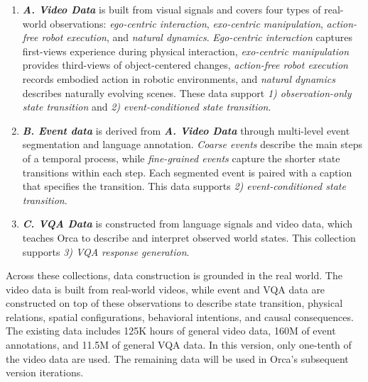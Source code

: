 \documentclass{llmxive}
\begin{document}
\vspace{-1ex}
\begin{enumerate}[
    leftmargin=1.35em,
    itemsep=0.35em,
    topsep=0.35em,
    parsep=0em
]
    \item[] 
    \textit{\textbf{A. Video Data}} is built from visual signals and covers four types of real-world observations: \textit{{ego-centric interaction}}, \textit{{exo-centric manipulation}}, {\textit{action-free robot execution}}, and {\textit{natural dynamics}}. {\textit{Ego-centric interaction}} captures first-views experience during physical interaction, {\textit{exo-centric manipulation}} provides third-views of object-centered changes, {\textit{action-free robot execution}} records embodied action in robotic environments, and {\textit{natural dynamics}} describes naturally evolving scenes. These data support \textit{1) observation-only state transition} and \textit{2) event-conditioned state transition}.

    \item[] 
    \textit{\textbf{B. Event data}} is derived from \textit{\textbf{A. Video Data}} through multi-level event segmentation and language annotation. {\textit{Coarse events}} describe the main steps of a temporal process, while {\textit{fine-grained events}} capture the shorter state transitions within each step. Each segmented event is paired with a caption that specifies the transition. This data supports \textit{2) event-conditioned state transition}.

    \item[]
    \textit{\textbf{C. VQA Data}} is constructed from language signals and video data, which teaches Orca to describe and interpret observed world states. This collection supports \textit{3) VQA response generation}.
\end{enumerate}
\vspace{-1ex}

Across these collections, data construction is grounded in the real world. The video data is built from real-world videos, while event and VQA data are constructed on top of these observations to describe state transition, physical relations, spatial configurations, behavioral intentions, and causal consequences. The existing data includes 125K hours of general video data, 160M of event annotations, and 11.5M of general VQA data. In this version, only one-tenth of the video data are used. The remaining data will be used in Orca's subsequent version iterations.
\end{document}
